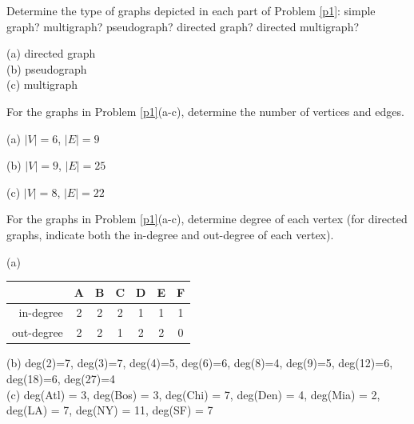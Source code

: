 \begin{questions}
\begin{parts}
\end{parts}
	\ifprintanswers
		\vspace{-10pt}
	\fi
	\begin{EnvFullwidth}
	\begin{solution}
		
	\end{solution}
	\end{EnvFullwidth}



 Determine the type of graphs depicted in each part of Problem \ref{p1}: simple graph? multigraph? pseudograph? directed graph? directed multigraph?
	\ifprintanswers
		\vspace{-10pt}
	\fi
	\begin{solution}
		(a) directed graph  \\[2pt]
		(b) pseudograph   \\[2pt]
		(c) multigraph
	\end{solution}

	\ifprintanswers
		\vspace{-10pt}
	\fi

 For the graphs in Problem \ref{p1}(a-c), determine the number of vertices and edges.
	\ifprintanswers
		\vspace{-10pt}
	\fi
	\begin{solution}
		(a) $|V| = 6$, $|E| = 9$

		(b) $|V| = 9$, $|E| = 25$ %

		(c) $|V| = 8$, $|E| = 22$
	\end{solution}




  For the graphs in Problem \ref{p1}(a-c), determine degree of each vertex (for directed graphs, indicate both the in-degree and out-degree of each vertex).
	\ifprintanswers
		\vspace{-10pt}
	\fi
	\begin{solution}
		(a) \begin{tabular}{r|cccccc|}
				 & A & B & C & D & E & F  \\
				\hline
				in-degree &  2 & 2 & 2 & 1 & 1 & 1  \\
				out-degree & 2 & 2 & 1 & 2 & 2 & 0   \\
			\end{tabular}

		(b) deg(2)=7, deg(3)=7, deg(4)=5, deg(6)=6, deg(8)=4, deg(9)=5, deg(12)=6, deg(18)=6, deg(27)=4 \\[3pt]
		(c) deg(Atl) = 3, deg(Bos) = 3, deg(Chi) = 7, deg(Den) = 4, deg(Mia) = 2, deg(LA) = 7, deg(NY) = 11, deg(SF) = 7
	\end{solution}




\end{questions}
